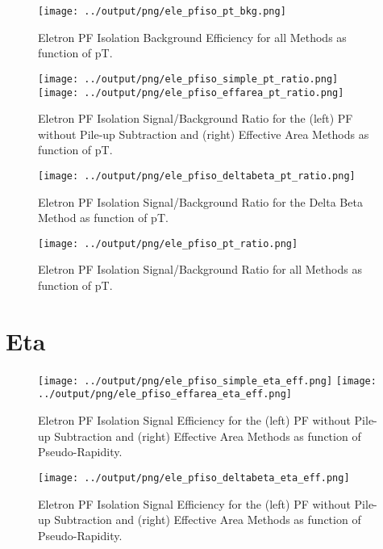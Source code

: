 \documentclass[11pt]{book}
\begin{document}
\begin{figure}[htb]
\centering
\texttt{[image: ../output/png/ele\_pfiso\_pt\_bkg.png]}
\caption{Eletron PF Isolation Background Efficiency for all Methods as function of pT.}
\label{fig:ele_pfiso_pt_bkg}
\end{figure}


\begin{figure}[htb]
\centering
\texttt{[image: ../output/png/ele\_pfiso\_simple\_pt\_ratio.png]}
\texttt{[image: ../output/png/ele\_pfiso\_effarea\_pt\_ratio.png]}
\caption{Eletron PF Isolation Signal/Background Ratio for the (left) PF without Pile-up Subtraction and (right) Effective Area Methods as function of pT.}
\label{fig:ele_pfiso_pt_ratio_simple_effarea}
\end{figure}

\begin{figure}[htb]
\centering
\texttt{[image: ../output/png/ele\_pfiso\_deltabeta\_pt\_ratio.png]}
\caption{Eletron PF Isolation Signal/Background Ratio for the Delta Beta Method as function of pT.}
\label{fig:ele_pfiso_pt_ratio_deltabeta}
\end{figure}


\begin{figure}[htb]
\centering
\texttt{[image: ../output/png/ele\_pfiso\_pt\_ratio.png]}
\caption{Eletron PF Isolation Signal/Background Ratio for all Methods as function of pT.}
\label{fig:ele_pfiso_pt_ratio}
\end{figure}

\clearpage


\section{Eta}
\begin{figure}[htb]
\centering
\texttt{[image: ../output/png/ele\_pfiso\_simple\_eta\_eff.png]}
\texttt{[image: ../output/png/ele\_pfiso\_effarea\_eta\_eff.png]}
\caption{Eletron PF Isolation Signal Efficiency for the (left) PF without Pile-up Subtraction and (right) Effective Area Methods as function of Pseudo-Rapidity.}
\label{fig:ele_pfiso_eta_eff_simple_effarea}
\end{figure}

\begin{figure}[htb]
\centering
\texttt{[image: ../output/png/ele\_pfiso\_deltabeta\_eta\_eff.png]}
\caption{Eletron PF Isolation Signal Efficiency for the (left) PF without Pile-up Subtraction and (right) Effective Area Methods as function of Pseudo-Rapidity.}
\label{fig:ele_pfiso_eta_eff_deltabeta}
\end{figure}
\end{document}
